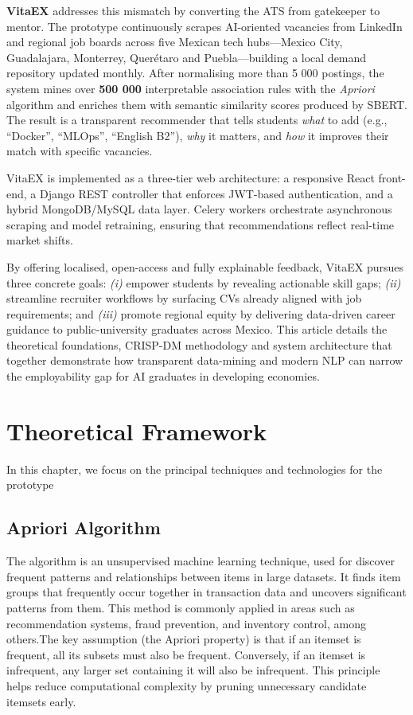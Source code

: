 \documentclass{svproc} %
\begin{document}
	\textbf{VitaEX} addresses this mismatch by converting the ATS from gatekeeper to mentor.  
	The prototype continuously scrapes AI-oriented vacancies from LinkedIn and regional job boards across five Mexican tech hubs—Mexico City, Guadalajara, Monterrey, Querétaro and Puebla—building a local demand repository updated monthly.  
	After normalising more than 5 000 postings, the system mines over \textbf{500 000} interpretable association rules with the \emph{Apriori} algorithm and enriches them with semantic similarity scores produced by SBERT.  
	The result is a transparent recommender that tells students \emph{what} to add (e.g., “Docker”, “MLOps”, “English B2”), \emph{why} it matters, and \emph{how} it improves their match with specific vacancies.
	
	VitaEX is implemented as a three-tier web architecture: a responsive React front-end, a Django REST controller that enforces JWT-based authentication, and a hybrid MongoDB/MySQL data layer.  
	Celery workers orchestrate asynchronous scraping and model retraining, ensuring that recommendations reflect real-time market shifts.
	
	By offering localised, open-access and fully explainable feedback, VitaEX pursues three concrete goals:  
	\emph{(i)} empower students by revealing actionable skill gaps;  
	\emph{(ii)} streamline recruiter workflows by surfacing CVs already aligned with job requirements; and  
	\emph{(iii)} promote regional equity by delivering data-driven career guidance to public-university graduates across Mexico.  
	This article details the theoretical foundations, CRISP-DM methodology and system architecture that together demonstrate how transparent data-mining and modern NLP can narrow the employability gap for AI graduates in developing economies.
	
	
	
	\section{Theoretical Framework}
	In this chapter, we focus on the principal techniques and technologies for the prototype
	\subsection{Apriori Algorithm}
	
	The algorithm is an unsupervised machine learning technique, used for discover frequent patterns and relationships between items in large datasets. It finds item groups that frequently occur together in transaction data and uncovers significant patterns from them. This method is commonly applied in areas such as recommendation systems, fraud prevention, and inventory control, among others.The key assumption (the Apriori property) is that if an itemset is frequent, all its subsets must also be frequent. Conversely, if an itemset is infrequent, any larger set containing it will also be infrequent. This principle helps reduce computational complexity by pruning unnecessary candidate itemsets early. \cite{ibm_apriori}
	
\end{document}
